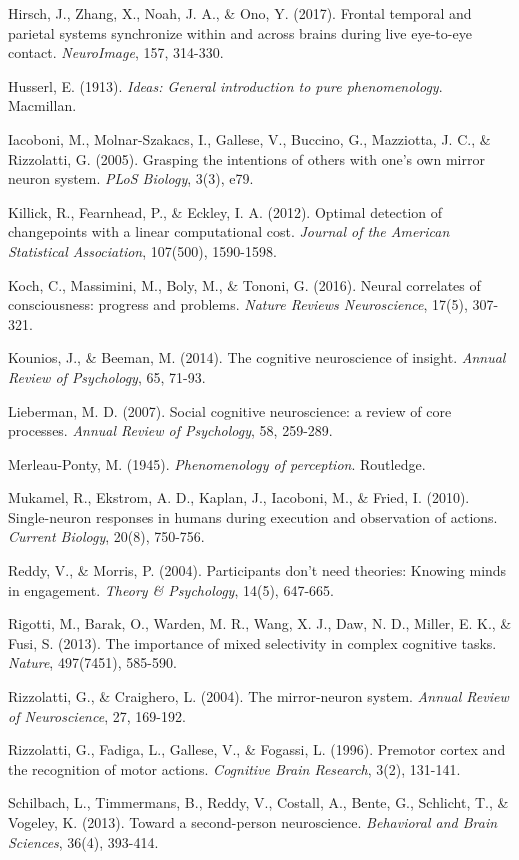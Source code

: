 \documentclass[12pt]{article}
\begin{document}
Hirsch, J., Zhang, X., Noah, J. A., \& Ono, Y. (2017). Frontal temporal and parietal systems synchronize within and across brains during live eye-to-eye contact. \textit{NeuroImage}, 157, 314-330.

Husserl, E. (1913). \textit{Ideas: General introduction to pure phenomenology}. Macmillan.

Iacoboni, M., Molnar-Szakacs, I., Gallese, V., Buccino, G., Mazziotta, J. C., \& Rizzolatti, G. (2005). Grasping the intentions of others with one's own mirror neuron system. \textit{PLoS Biology}, 3(3), e79.

Killick, R., Fearnhead, P., \& Eckley, I. A. (2012). Optimal detection of changepoints with a linear computational cost. \textit{Journal of the American Statistical Association}, 107(500), 1590-1598.

Koch, C., Massimini, M., Boly, M., \& Tononi, G. (2016). Neural correlates of consciousness: progress and problems. \textit{Nature Reviews Neuroscience}, 17(5), 307-321.

Kounios, J., \& Beeman, M. (2014). The cognitive neuroscience of insight. \textit{Annual Review of Psychology}, 65, 71-93.

Lieberman, M. D. (2007). Social cognitive neuroscience: a review of core processes. \textit{Annual Review of Psychology}, 58, 259-289.

Merleau-Ponty, M. (1945). \textit{Phenomenology of perception}. Routledge.

Mukamel, R., Ekstrom, A. D., Kaplan, J., Iacoboni, M., \& Fried, I. (2010). Single-neuron responses in humans during execution and observation of actions. \textit{Current Biology}, 20(8), 750-756.

Reddy, V., \& Morris, P. (2004). Participants don't need theories: Knowing minds in engagement. \textit{Theory \& Psychology}, 14(5), 647-665.

Rigotti, M., Barak, O., Warden, M. R., Wang, X. J., Daw, N. D., Miller, E. K., \& Fusi, S. (2013). The importance of mixed selectivity in complex cognitive tasks. \textit{Nature}, 497(7451), 585-590.

Rizzolatti, G., \& Craighero, L. (2004). The mirror-neuron system. \textit{Annual Review of Neuroscience}, 27, 169-192.

Rizzolatti, G., Fadiga, L., Gallese, V., \& Fogassi, L. (1996). Premotor cortex and the recognition of motor actions. \textit{Cognitive Brain Research}, 3(2), 131-141.

Schilbach, L., Timmermans, B., Reddy, V., Costall, A., Bente, G., Schlicht, T., \& Vogeley, K. (2013). Toward a second-person neuroscience. \textit{Behavioral and Brain Sciences}, 36(4), 393-414.
\end{document}
